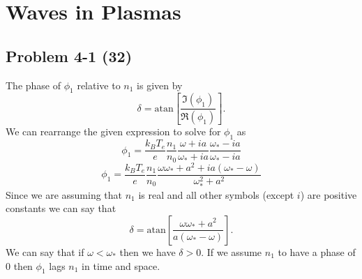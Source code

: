 \chapter{Waves in Plasmas}
\label{ch:Four}

\section*{Problem 4-1 (32)}
\label{sec:4-1}
The phase of \(\phi_1 \) relative to \(n_1\) is given by
\begin{equation*}
\delta = \text{atan}\left[\dfrac{\Im(\phi_1)}{\Re(\phi_1)} \right].
\end{equation*}
We can rearrange the given expression to solve for \(\phi_1 \) as
\begin{equation*}
	\phi_1 = \dfrac{k_BT_e}{e}\dfrac{n_1}{n_0}\dfrac{\omega + ia}{\omega_* + ia} \dfrac{\omega_* - ia}{\omega_*-ia}
\end{equation*}
\begin{equation*}
	\phi_1 = \dfrac{k_BT_e}{e}\dfrac{n_1}{n_0}\dfrac{\omega\omega_* + a^2 + ia(\omega_* - \omega)}{\omega_*^2 + a^2}
\end{equation*}
Since we are assuming that \(n_1\) is real and all other symbols (except \(i\)) are positive constants we can say that
\begin{equation*}
	\delta = \text{atan}\left[\dfrac{\omega\omega_* + a^2}{a(\omega_*-\omega)} \right].
\end{equation*}
We can say that if \(\omega < \omega_* \) then we have \(\delta > 0 \). If we assume \(n_1\) to have a phase of 0 then \(\phi_1\) lags \(n_1\) in time and space.


